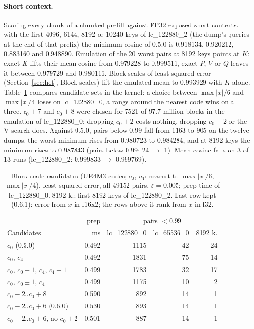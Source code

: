 \documentclass[10pt,twocolumn]{article}
\newcommand{\eps}{\varepsilon}
\begin{document}
\paragraph{Short context.} Scoring every chunk of a chunked prefill against FP32 exposed short contexts: with the
first 4096, 6144, 8192 or 10240 keys of lc\_122880\_2 (the dump's queries at the end of that prefix) the minimum
cosine of 0.5.0 is 0.918134, 0.920212, 0.883160 and 0.948890. Emulation of the 20 worst pairs at 8192 keys points at
$K$: exact $K$ lifts their mean cosine from 0.979228 to 0.999511, exact $P$, $V$ or $Q$ leaves it between 0.979729
and 0.980116. Block scales of least squared error (Section~\ref{sec:hot}, Block scales) lift the emulated mean to
0.993929 with $K$ alone. Table~\ref{tab:bs} compares candidate sets in the kernel: a choice between $\max|x|/6$ and
$\max|x|/4$ loses on lc\_122880\_0, a range around the nearest code wins on all three. $c_0+7$ and $c_0+8$ were chosen
for 7521 of 97.7 million blocks in the emulation of lc\_122880\_0; dropping $c_0+2$ costs nothing, dropping $c_0-2$ or
the V search does. Against 0.5.0, pairs below 0.99 fall from 1163 to 905 on the twelve dumps, the worst minimum rises
from 0.980723 to 0.984284, and at 8192 keys the minimum rises to 0.987843 (pairs below 0.99: 24 $\to$ 1). Mean
cosine falls on 3 of 13 runs (lc\_122880\_2: 0.999833 $\to$ 0.999769).

\begin{table}[t]
\centering\footnotesize
\setlength{\tabcolsep}{1.5pt}
\begin{tabular}{@{}lrrrr@{}}
\toprule
 & prep & \multicolumn{3}{c}{pairs $<0.99$} \\
Candidates & ms & lc\_122880\_0 & lc\_65536\_0 & 8192 k. \\
\midrule
$c_0$ (0.5.0) & 0.492 & 1115 & 42 & 24 \\
$c_0$, $c_4$ & 0.492 & 1831 & 75 & 14 \\
$c_0$, $c_0+1$, $c_4$, $c_4+1$ & 0.499 & 1783 & 32 & 17 \\
$c_0$, $c_0\pm1$, $c_4$ & 0.499 & 1175 & 10 & 2 \\
$c_0-2..c_0+8$ & 0.590 & 892 & 14 & 1 \\
$c_0-2..c_0+6$ (0.6.0) & 0.530 & 893 & 14 & 1 \\
$c_0-2..c_0+6$, no $c_0+2$ & 0.501 & 887 & 14 & 1 \\
\bottomrule
\end{tabular}
\caption{Block scale candidates (UE4M3 codes; $c_0$, $c_4$: nearest to $\max|x|/6$, $\max|x|/4$), least squared
error, all 49152 pairs, $\eps=0.005$; prep time of lc\_122880\_0. 8192 k.: first 8192 keys of lc\_122880\_2. Last row kept
(0.6.1): error from $x$ in f16x2; the rows above it rank from $x$ in f32.}
\label{tab:bs}
\end{table}
\end{document}

